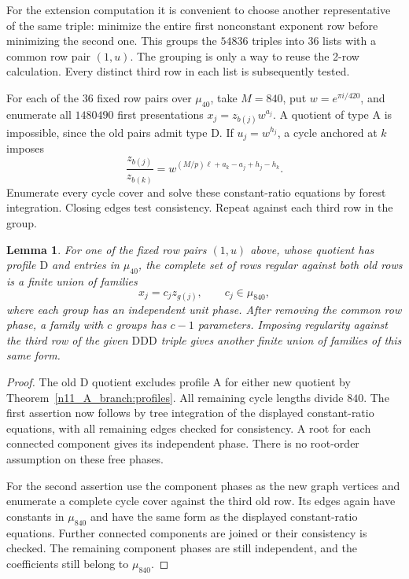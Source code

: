 \documentclass[11pt,a4paper]{article}
\newtheorem{lemma}[theorem]{Lemma}
\theoremstyle{plain}
\theoremstyle{definition}
\theoremstyle{plain}
\begin{document}
For the extension computation it is convenient to choose another representative of the same triple: minimize the entire first nonconstant exponent row before minimizing the second one. This groups the $54836$ triples into $36$ lists with a common row pair $(1,u)$. The grouping is only a way to reuse the 2-row calculation. Every distinct third row in each list is subsequently tested.

\medskip
For each of the $36$ fixed row pairs over $\mu_{40}$, take $M=840$, put $w=e^{\pi i/420}$, and enumerate all $1480490$ first presentations $x_j=z_{b(j)}w^{a_j}$. A quotient of type $\mathrm{A}$ is impossible, since the old pairs admit type $\mathrm{D}$. If $u_j=w^{h_j}$, a cycle anchored at $k$ imposes
\[
\frac{z_{b(j)}}{z_{b(k)}}=w^{(M/p)\ell+a_k-a_j+h_j-h_k}.
\]
Enumerate every cycle cover and solve these constant-ratio equations by forest integration. Closing edges test consistency. Repeat against each third row in the group.

\par\addvspace{\medskipamount}\noindent
\begin{minipage}{\linewidth}
\begin{lemma}\label{n11_fourth:rowfamilies}
For one of the fixed row pairs $(1,u)$ above, whose quotient has profile $\mathrm{D}$ and entries in $\mu_{40}$, the complete set of rows regular against both old rows is a finite union of families
\[
x_j=c_j z_{g(j)},\qquad c_j\in\mu_{840},
\]
where each group has an independent unit phase. After removing the common row phase, a family with $c$ groups has $c-1$ parameters. Imposing regularity against the third row of the given $\mathrm{DDD}$ triple gives another finite union of families of this same form.
\end{lemma}
\end{minipage}
\par\addvspace{\medskipamount}

\begin{proof}
The old $\mathrm{D}$ quotient excludes profile $\mathrm{A}$ for either new quotient by Theorem~\ref{n11_A_branch:profiles}. All remaining cycle lengths divide $840$. The first assertion now follows by tree integration of the displayed constant-ratio equations, with all remaining edges checked for consistency. A root for each connected component gives its independent phase. There is no root-order assumption on these free phases.

For the second assertion use the component phases as the new graph vertices and enumerate a complete cycle cover against the third old row. Its edges again have constants in $\mu_{840}$ and have the same form as the displayed constant-ratio equations. Further connected components are joined or their consistency is checked. The remaining component phases are still independent, and the coefficients still belong to $\mu_{840}$.
\end{proof}
\end{document}
